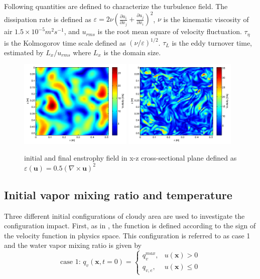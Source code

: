 \documentclass[draft,jgrga]{AGUTeX}
\begin{document}
\begin{article}
Following quantities are defined to characterize the turbulence field. 
The dissipation rate is defined as $\varepsilon=2\nu(\frac{\partial u_{i}}{\partial x_{j}}+\frac{\partial u_{j}}{\partial x_{i}})^{2}$,
$\nu$ is the kinematic viscosity of air $1.5\times10^{-5}m^{2}s^{-1}$, and $u_{rms}$
is the root mean square of velocity fluctuation. $\tau_{\eta}$ is
the Kolmogorov time scale defined as $(\nu/\varepsilon)^{1/2}$. $\tau_L$
is the eddy turnover time, estimated by $L_x/u_{rms}$
where $L_x$ is the domain size.

\begin{figure}[H]\centering
\includegraphics[width=0.48\textwidth]{Figures/vortex-0}
\includegraphics[width=0.48\textwidth]{Figures/vortex-1}

\caption{initial and final enstrophy field in x-z cross-sectional
plane defined as $\varepsilon(\mathbf{u}) = 0.5(\nabla\times\mathbf{u})^2$\label{fig:enstrophy}}
\end{figure}

\subsection{Initial vapor mixing ratio and temperature}
Three different initial configurations of cloudy area are used to investigate the configuration impact. First, as in \cite{And04}, the function is defined according to the sign of the velocity function in physics space. This configuration is referred to as case 1 and the water vapor mixing ratio is given by
\begin{equation}
\mbox{case 1: } q_v(\mathbf{x},t=0) = 
\left\{\begin{array}{lr}
q_v^{max}, & u(\mathbf{x}) > 0\\
q_{v,e}, & u(\mathbf{x}) \le 0
\end{array}\right.\label{case1}
\end{equation}


\end{article}
\end{document}
